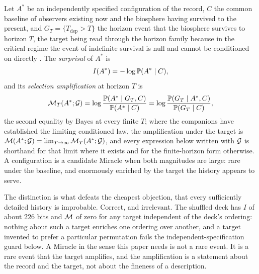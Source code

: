 \begin{definition}\label{def:magnitudes}
Let $A^\ast$ be an independently specified configuration of the record,
$C$ the common baseline of observers existing now and the biosphere
having survived to the present, and $G_T=\{T_{\mathrm{dep}}>T\}$ the
horizon event that the biosphere survives to horizon $T$, the target
being read through the horizon family because in the critical regime
the event of indefinite survival is null and cannot be conditioned on
directly \cite{GoldenSurvivorship,GoldenTargeted}. The \emph{surprisal} of $A^\ast$ is
\[
I(A^\ast)=-\log\mathbb{P}(A^\ast\mid C),
\]
and its \emph{selection amplification} at horizon $T$ is
\[
\mathcal{M}_T(A^\ast;\mathcal{G})=\log\frac{\mathbb{P}(A^\ast\mid G_T,C)}{\mathbb{P}(A^\ast\mid C)}
=\log\frac{\mathbb{P}(G_T\mid A^\ast,C)}{\mathbb{P}(G_T\mid C)},
\]
the second equality by Bayes at every finite $T$; where the companions
have established the limiting conditioned law, the amplification under
the target is $\mathcal{M}(A^\ast;\mathcal{G})=\lim_{T\to\infty}\mathcal{M}_T(A^\ast;\mathcal{G})$, and
every expression below written with $\mathcal{G}$ is shorthand for that limit
where it exists and for the finite-horizon form otherwise. A
configuration is a candidate Miracle when both magnitudes are large:
rare under the baseline, and enormously enriched by the target the
history appears to serve.
\end{definition}

The distinction is what defeats the cheapest objection, that every
sufficiently detailed history is improbable. Correct, and irrelevant.
The shuffled deck has $I$ of about $226$ bits and $\mathcal{M}$ of zero for any
target independent of the deck's ordering: nothing about such a target
enriches one ordering over another, and a target invented to prefer a
particular permutation fails the independent-specification guard
below. A Miracle in the
sense this paper needs is not a rare event. It is a rare event that the
target amplifies, and the amplification is a statement about the record
and the target, not about the fineness of a description.

